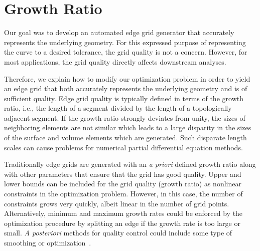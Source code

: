 \section{Growth Ratio}
Our goal was to develop an automated edge grid generator that accurately 
represents the underlying geometry.  For this expressed purpose of 
representing the curve to a desired tolerance, the grid quality 
is not a concern.  However, for most applications, the grid quality 
directly affects downstream analyses.

Therefore, we explain how to modify our optimization problem in order to 
yield an edge grid that both accurately represents the underlying geometry 
and is of sufficient quality.  Edge grid quality is typically defined in 
terms of the growth ratio, i.e., the length of a segment divided by the 
length of a topologically adjacent segment.  If the growth ratio strongly 
deviates from unity, the sizes of neighboring elements are not 
similar which leads to a large disparity in the sizes of the surface and 
volume elements which are generated.  Such disparate length scales can 
cause problems for numerical partial differential equation methods.

Traditionally edge grids are generated with an {\it{a priori}} defined 
growth ratio along with other parameters that ensure that the grid has 
good quality.  Upper and lower bounds can be included for the grid 
quality (growth ratio) as nonlinear constraints in the optimization problem.  However, in 
this case, the number of constraints grows very quickly, albeit 
linear in the number of grid points.  Alternatively, minimum and maximum 
growth rates could be enforced by the optimization procedure by splitting 
an edge if the growth rate is too large or small.  {\it{A posteriori}} 
methods for quality control could include some type of 
smoothing or optimization~\cite{lori_pat,feasnewt,multiobjective,logbarrier}.

